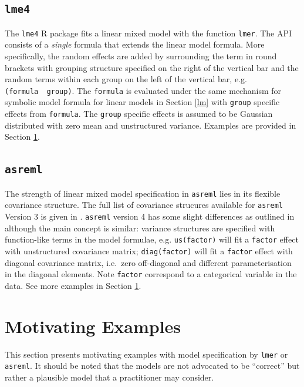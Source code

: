 \documentclass[runningheads]{llncs}
\begin{document}
\hypertarget{lme4}{%
\subsection{\texorpdfstring{\texttt{lme4}}{lme4}}\label{lme4}}

The \texttt{lme4} R package fits a linear mixed model with the function \texttt{lmer}. The API consists of a \emph{single} formula that extends the linear model formula. More specifically, the random effects are added by surrounding the term in round brackets with grouping structure specified on the right of the vertical bar and the random terms within each group on the left of the vertical bar, e.g. \texttt{(formula\ \textbar{}\ group)}. The \texttt{formula} is evaluated under the same mechanism for symbolic model formula for linear models in Section \ref{lm} with \texttt{group} specific effects from \texttt{formula}. The \texttt{group} specific effects is assumed to be Gaussian distributed with zero mean and unstructured variance. Examples are provided in Section \ref{examples}.

\hypertarget{asreml}{%
\subsection{\texorpdfstring{\texttt{asreml}}{asreml}}\label{asreml}}

The strength of linear mixed model specification in \texttt{asreml} lies in its flexible covariance structure. The full list of covariance strucures available for \texttt{asreml} Version 3 is given in \textcite{Butler2009}. \texttt{asreml} version 4 has some slight differences as outlined in \textcite{Butler2018} although the main concept is similar: variance structures are specified with function-like terms in the model formulae, e.g. \texttt{us(factor)} will fit a \texttt{factor} effect with unstructured covariance matrix; \texttt{diag(factor)} will fit a \texttt{factor} effect with diagonal covariance matrix, i.e.~zero off-diagonal and different parameterisation in the diagonal elements. Note \texttt{factor} correspond to a categorical variable in the data. See more examples in Section \ref{examples}.

\hypertarget{examples}{%
\section{Motivating Examples}\label{examples}}

This section presents motivating examples with model specification by \texttt{lmer} or \texttt{asreml}. It should be noted that the models are not advocated to be ``correct'' but rather a plausible model that a practitioner may consider.
\end{document}
